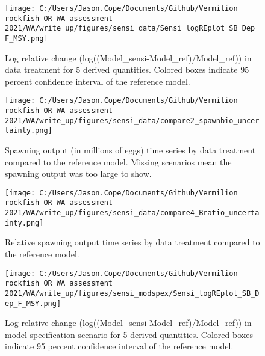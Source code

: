 \documentclass[11pt,
  english,
  a4paper,
]{article}
\begin{document}
\begin{figure}
\centering
\texttt{[image: C:/Users/Jason.Cope/Documents/Github/Vermilion rockfish OR WA assessment 2021/WA/write\_up/figures/sensi\_data/Sensi\_logREplot\_SB\_Dep\_F\_MSY.png]}
\caption{Log relative change (log((Model\_sensi-Model\_ref)/Model\_ref)) in data treatment for 5 derived quantities. Colored boxes indicate 95 percent confidence interval of the reference model.\label{fig:sensi-data-RE}}
\end{figure}

\tagmcend\tagstructend


\begin{figure}
\centering
\texttt{[image: C:/Users/Jason.Cope/Documents/Github/Vermilion rockfish OR WA assessment 2021/WA/write\_up/figures/sensi\_data/compare2\_spawnbio\_uncertainty.png]}
\caption{Spawning output (in millions of eggs) time series by data treatment compared to the reference model. Missing scenarios mean the spawning output was too large to show.\label{fig:sensi-data-ssb}}
\end{figure}

\tagmcend\tagstructend


\begin{figure}
\centering
\texttt{[image: C:/Users/Jason.Cope/Documents/Github/Vermilion rockfish OR WA assessment 2021/WA/write\_up/figures/sensi\_data/compare4\_Bratio\_uncertainty.png]}
\caption{Relative spawning output time series by data treatment compared to the reference model.\label{fig:sensi-data-depl}}
\end{figure}

\tagmcend\tagstructend


\begin{figure}
\centering
\texttt{[image: C:/Users/Jason.Cope/Documents/Github/Vermilion rockfish OR WA assessment 2021/WA/write\_up/figures/sensi\_modspex/Sensi\_logREplot\_SB\_Dep\_F\_MSY.png]}
\caption{Log relative change (log((Model\_sensi-Model\_ref)/Model\_ref)) in model specification scenario for 5 derived quantities. Colored boxes indicate 95 percent confidence interval of the reference model.\label{fig:sensi-modspec-RE}}
\end{figure}
\end{document}
